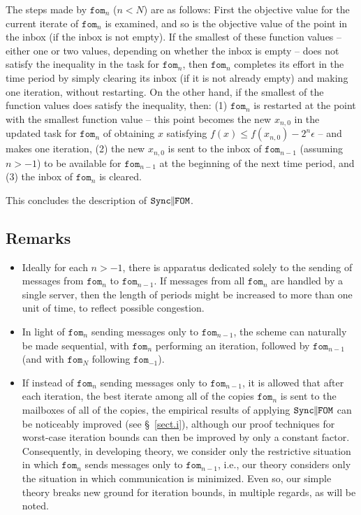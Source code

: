 \documentclass[reqno, 11pt]{amsart}
\numberwithin{equation}{section}
\newcommand{\nt}{\negthinspace}
\newcommand{\fom}{\mathtt{fom}}
\newcommand{\parfom}{\parallel \nt \nt  \mathtt{FOM}}
\newcommand{\sparfom}{\mathtt{Sync} \nt \nt  \parfom}
\begin{document}
The steps made by $ \fom_n $ ($ n < N $) are as follows:
First the objective value for the current iterate of $ \fom_n $ is examined, and so is the objective value of the point in the inbox (if the inbox is not empty). If the smallest of these function values -- either one or two values, depending on whether the inbox is empty -- does not satisfy the inequality in the task for $ \fom_n $, then $ \fom_n $ completes its effort in the time period by simply clearing its inbox (if it is not already empty) and making one iteration, without restarting.  On the other hand, if the smallest of the function values does satisfy the inequality, then: (1) $ \fom_n $ is restarted at the point with the smallest function value -- this point becomes the new $ x_{n,0} $ in the updated task for $ \fom_n $ of obtaining $ x $ satisfying $ f(x) \leq f(x_{n,0}) - 2^n \epsilon $ -- and makes one iteration, (2) the new $ x_{n,0} $ is sent to the inbox of $ \fom_{n-1} $ (assuming $ n > -1 $) to be available for $ \fom_{n-1} $ at the beginning of the next time period, and (3) the inbox of $ \fom_n $ is cleared.

This concludes the description of $ \sparfom $.
\vspace{2mm}
 

\subsection{Remarks} \label{sect.db} 
\begin{itemize}
\item Ideally for each $ n > -1 $,  there is apparatus dedicated solely to the sending of messages from $ \fom_n $ to $ \fom_{n-1} $. If messages from all $ \fom_n $ are handled by a single server, then the length of periods might be increased to more than one unit of time, to reflect possible congestion.
\item In light of $ \fom_n $ sending messages only to $ \fom_{n-1} $, the scheme can naturally be made sequential, with $ \fom_n $ performing an iteration, followed by $ \fom_{n-1} $ (and with $ \fom_N $ following $ \fom_{-1} $). 
\item If instead of $ \fom_n $ sending messages only to $ \fom_{n-1} $, it is allowed that after each iteration, the best iterate among all of the copies $ \fom_n $ is sent to the mailboxes of all of the copies, the empirical results of applying $ \sparfom $ can be noticeably improved (see \S~\ref{sect.i}), although our proof techniques for worst-case iteration bounds can then be improved by only a constant factor. Consequently, in developing theory, we consider only the restrictive situation in which $ \fom_n $ sends messages only to $ \fom_{n-1} $, i.e., our theory considers only the situation in which communication is minimized. Even so, our simple theory breaks new ground for iteration bounds, in multiple regards, as will be noted.
\end{itemize}
\end{document}
